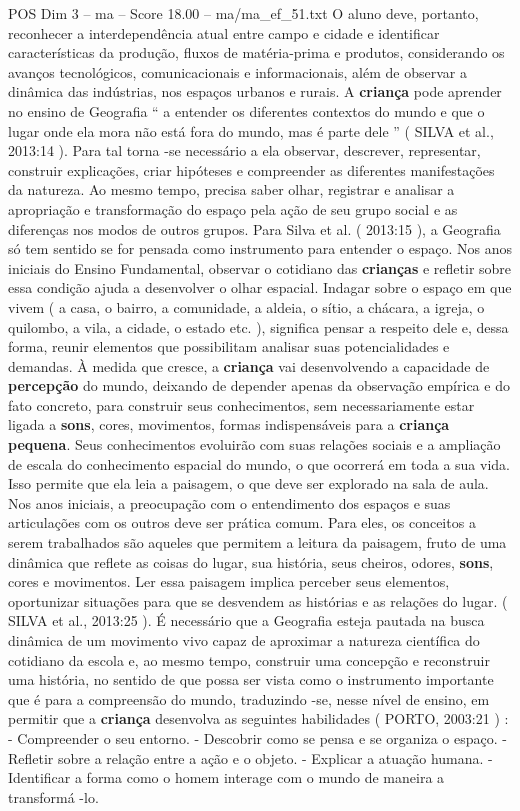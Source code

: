 \begin{textsample}{POS Dim 3 – ma – Score 18.00 – ma/ma\_ef\_51.txt}
O aluno deve, portanto, reconhecer a interdependência atual entre campo e cidade e identificar características da produção, fluxos de matéria-prima e produtos, considerando os avanços tecnológicos, comunicacionais e informacionais, além de observar a dinâmica das indústrias, nos espaços urbanos e rurais.
A \textbf{criança} pode aprender no ensino de Geografia “ a entender os diferentes contextos do mundo e que o lugar onde ela mora não está fora do mundo, mas é parte dele ” ( SILVA et al., 2013:14 ).
Para tal torna -se necessário a ela observar, descrever, representar, construir explicações, criar hipóteses e compreender as diferentes manifestações da natureza.
Ao mesmo tempo, precisa saber olhar, registrar e analisar a apropriação e transformação do espaço pela ação de seu grupo social e as diferenças nos modos de outros grupos.
Para Silva et al. ( 2013:15 ), a Geografia só tem sentido se for pensada como instrumento para entender o espaço.
Nos anos iniciais do Ensino Fundamental, observar o cotidiano das \textbf{crianças} e refletir sobre essa condição ajuda a desenvolver o olhar espacial.
Indagar sobre o espaço em que vivem ( a casa, o bairro, a comunidade, a aldeia, o sítio, a chácara, a igreja, o quilombo, a vila, a cidade, o estado etc. ), significa pensar a respeito dele e, dessa forma, reunir elementos que possibilitam analisar suas potencialidades e demandas.
À medida que cresce, a \textbf{criança} vai desenvolvendo a capacidade de \textbf{percepção} do mundo, deixando de depender apenas da observação empírica e do fato concreto, para construir seus conhecimentos, sem necessariamente estar ligada a \textbf{sons}, cores, movimentos, formas indispensáveis para a \textbf{criança} \textbf{pequena}.
Seus conhecimentos evoluirão com suas relações sociais e a ampliação de escala do conhecimento espacial do mundo, o que ocorrerá em toda a sua vida.
Isso permite que ela leia a paisagem, o que deve ser explorado na sala de aula.
Nos anos iniciais, a preocupação com o entendimento dos espaços e suas articulações com os outros deve ser prática comum.
Para eles, os conceitos a serem trabalhados são aqueles que permitem a leitura da paisagem, fruto de uma dinâmica que reflete as coisas do lugar, sua história, seus cheiros, odores, \textbf{sons}, cores e movimentos.
Ler essa paisagem implica perceber seus elementos, oportunizar situações para que se desvendem as histórias e as relações do lugar. ( SILVA et al., 2013:25 ).
É necessário que a Geografia esteja pautada na busca dinâmica de um movimento vivo capaz de aproximar a natureza científica do cotidiano da escola e, ao mesmo tempo, construir uma concepção e reconstruir uma história, no sentido de que possa ser vista como o instrumento importante que é para a compreensão do mundo, traduzindo -se, nesse nível de ensino, em permitir que a \textbf{criança} desenvolva as seguintes habilidades ( PORTO, 2003:21 ) : - Compreender o seu entorno. - Descobrir como se pensa e se organiza o espaço. - Refletir sobre a relação entre a ação e o objeto. - Explicar a atuação humana. - Identificar a forma como o homem interage com o mundo de maneira a transformá -lo.

\end{textsample}
